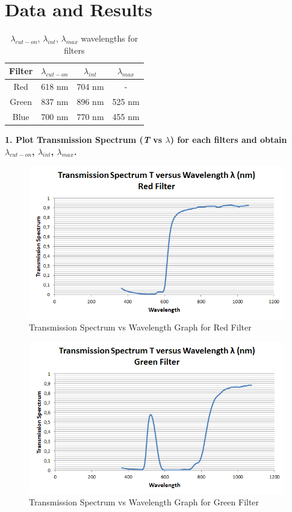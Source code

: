 \documentclass[a4paper,12pt]{report}
\begin{document}
\chapter{Data and Results}
\begin{table}[h]
	\begin{center}
\begin{tabular}{|c|c|c|c|}
	\hline Filter & $\lambda_{cut-on}$ & $\lambda_{int}$ & $\lambda_{max}$ \\ 
	\hline Red & 618 nm & 704 nm & - \\ 
	\hline Green & 837 nm & 896 nm & 525 nm \\ 
	\hline Blue & 700 nm & 770 nm & 455 nm \\ 
	\hline 
\end{tabular}  
\end{center}
\caption{$\lambda_{cut-on}$, $\lambda_{int}$, $\lambda_{max}$ wavelengths for filters} 
\end{table}
\textbf{1. Plot Transmission Spectrum (\textit{T} vs $\lambda$) for each filters and obtain $\lambda_{cut-on}$, $\lambda_{int}$, $\lambda_{max}$.} 
\begin{figure}[h!]
\centering
\includegraphics[width=1.0\linewidth, height=0.4\textheight]{Red}
\caption{Transmission Spectrum vs Wavelength Graph for Red Filter}
\label{fig:Red}
\end{figure}
\begin{figure}[h!]
\centering
\includegraphics[width=1.0\linewidth, height=0.4\textheight]{Green}
\caption{Transmission Spectrum vs Wavelength Graph for Green Filter}
\label{fig:Green}
\end{figure}
\end{document}
